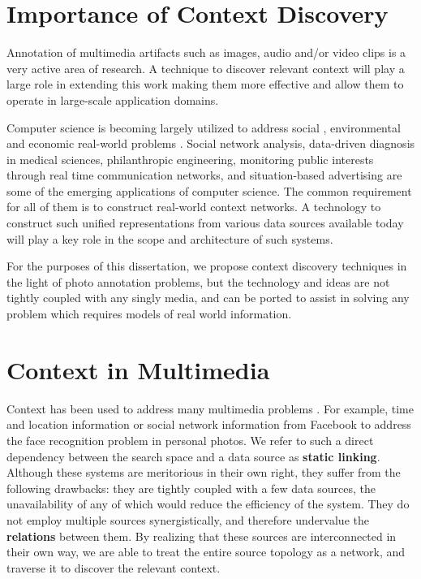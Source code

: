 \section{Importance of Context Discovery}

Annotation of multimedia artifacts such as images, audio and/or video clips \cite{galleguillos2010context, pang2011efficient, poppe2010survey, vinciarelli2009social, yang2010recognizing, zhao2003face, zeng2009survey} is a very active area of research. A technique to discover relevant context will play a large role in extending this work making them more effective and allow them to operate in large-scale application domains.

Computer science is becoming largely utilized to address social \cite{sambasivan2010intermediated}, environmental \cite{ahrens2011data} and economic real-world problems \cite{chlistalla2011high}. Social network analysis, data-driven diagnosis in medical sciences, philanthropic engineering, monitoring public interests through real time communication networks, and situation-based advertising are some of the emerging applications of computer science. The common requirement for all of them is to construct real-world context networks. A technology to construct such unified representations from various data sources available today will play a key role in the scope and architecture of such systems.

For the purposes of this dissertation, we propose context discovery techniques in the light of photo annotation problems, but the technology and ideas are not tightly coupled with any singly media, and can be ported to assist in solving any problem which requires models of real world information.

\section{Context in Multimedia}

Context has been used to address many multimedia problems \cite{henter2012tag, li2012fusing, naaman2005identity, o2009context,stone2008autotagging}. For example, time and location information or social network information from Facebook to address the face recognition problem in personal photos. We refer to such a direct dependency between the search space and a data source as \textbf{static linking}. Although these systems are meritorious in their own right, they suffer from the following drawbacks: they are tightly coupled with a few data sources, the unavailability of any of which would reduce the efficiency of the system. They do not employ multiple sources synergistically, and therefore undervalue the \textbf{relations} between them. By realizing that these sources are interconnected in their own way, we are able to treat the entire source topology as a network, and traverse it to discover the relevant context.

